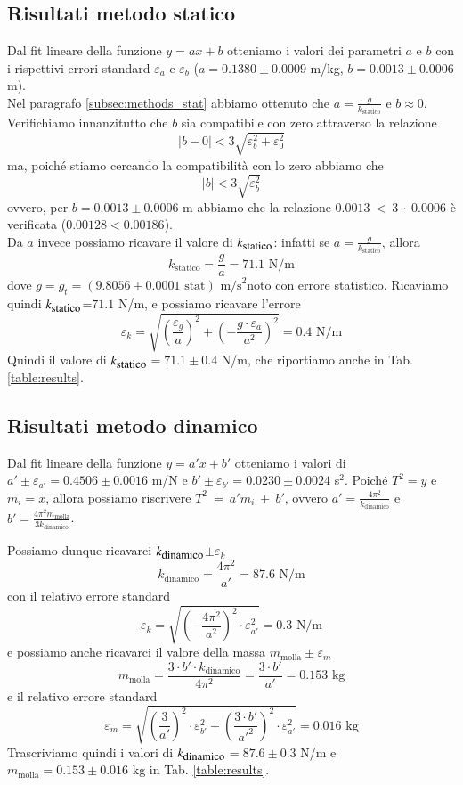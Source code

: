 \documentclass[italian, a4paper, 10pt, twocolumn]{../../style/lab_unige}
\newcommand{\reftab}[1]{Tab. {\ref{#1}}}%
\newcommand{\gLab}{$g_t=(9.8056\pm0.0001 \text{ stat}) \text{ m/s}^2$\space}
\newcommand{\ks}{$k_{\text{\small statico}}$\space}
\newcommand{\kd}{$k_{\text{\small dinamico}}$\space}
\begin{document}
{    \subsection{Risultati metodo statico}
    \label{subsec:results_sts}
    Dal fit lineare della funzione $y=ax+b$ otteniamo i valori dei parametri $a$ e $b$ con i rispettivi errori 
    standard $\varepsilon_a$ e $\varepsilon_b$ ($a = 0.1380\pm0.0009$ m/kg, $b = 0.0013\pm0.0006$ m).\\
    Nel paragrafo \ref{subsec:methods_stat} abbiamo ottenuto che $a=\frac{g}{k_{\text{statico}}}$ e $b\approx0$.
    Verifichiamo innanzitutto che $b$ sia compatibile con zero attraverso la relazione
    \[
        \left|b-0\right|<3\sqrt{\varepsilon_b^{2}+\varepsilon_0^{2}}
    \]
    ma, poiché stiamo cercando la compatibilità con lo zero abbiamo che 
    \[
        \left|b\right|<3\sqrt{\varepsilon_b^{2}}
    \]
    ovvero, per $b=0.0013\pm0.0006$ m abbiamo che la relazione $0.0013~<~3~\cdot~0.0006$ è verificata
    ($0.00128<0.00186$).\\
    Da $a$ invece possiamo ricavare il valore di \ks: infatti se $a=\frac{g}{k_{\text{statico}}}$, allora 
    \[
        k_{\text{statico}} = \frac{g}{a} = 71.1 \text{ N/m}
    \]
    dove $g=$\gLab noto con errore statistico. Ricaviamo quindi \ks=$71.1$ N/m, e possiamo ricavare l'errore 
    \[
        \varepsilon_k = \sqrt{\left(\frac{\varepsilon_g}{a}\right)^2+\left(-\frac{g\cdot\varepsilon_a}
        {a^2}\right)^2} = 0.4 \text{ N/m} 
    \]
    Quindi il valore di \ks$=71.1\pm0.4$ N/m, che riportiamo anche in \reftab{table:results}.

    \subsection{Risultati metodo dinamico}
    \label{subsec:results_dyn}

    Dal fit lineare della funzione $y=a'x+b'$ otteniamo i valori di $a'\pm\varepsilon_{a'} = 0.4506\pm0.0016$ m/N
    e $b'\pm\varepsilon_{b'} = 0.0230\pm0.0024$ s$^2$.
    Poiché $T^2 = y$ e $m_i = x$, allora possiamo riscrivere $T^2~=~a'm_i~+~b'$, ovvero 
    $a' = \frac{4\pi^2}{k_{\text{dinamico}}}$ e $b' = \frac{4\pi^2m_{\text{molla}}}{3k_{\text{dinamico}}}$.

    Possiamo dunque ricavarci \kd$\pm\varepsilon_k$
    \[
        k_{\text{dinamico}} = \frac{4\pi^2}{a'} = 87.6 \text{ N/m}
    \] 
    con il relativo errore standard 
    \[
        \varepsilon_k = \sqrt{\left(-\frac{4\pi^2}{a^2}\right)^2\cdot\varepsilon_{a'}^2} = 0.3\text{ N/m}  
    \]
    e possiamo anche ricavarci il valore della massa $m_{\text{molla}}\pm\varepsilon_m$
    \[
        m_{\text{molla}} = \frac{3\cdot b'\cdot k_{\text{dinamico}}}{4\pi^2} = \frac{3\cdot b'}{a'} = 0.153 
        \text{ kg}
    \]
    e il relativo errore standard
    \[
        \varepsilon_m = \sqrt{\left(\frac{3}{a'}\right)^2\cdot\varepsilon_{b'}^2 + \left(\frac{3\cdot b'}
        {{a'}^2}\right)^2\cdot\varepsilon_{a'}^2} = 0.016 \text{ kg}
    \]
    Trascriviamo quindi i valori di \kd$ = 87.6\pm0.3$ N/m e $m_{\text{molla}} = 0.153\pm0.016$ kg in 
    \reftab{table:results}.

}
\end{document}
